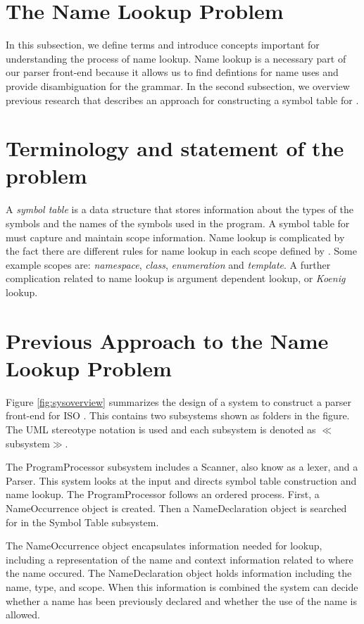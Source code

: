 \section{The Name Lookup Problem}

In this subsection, we define terms and introduce concepts
important for understanding the process of name lookup.
Name lookup is a necessary part of our parser front-end because it
allows us to find defintions for name uses and provide disambiguation for the grammar.
In the second subsection, we overview previous research that describes an approach for
constructing a symbol table for {\CPP}\cite{powertools}.

\section{Terminology and statement of the problem}

A {\em symbol table} is a data structure that stores information
about the types of the symbols and the names of the
symbols used in the program.  A symbol table for {\CPP} must capture and maintain
scope information.  Name lookup is complicated by the fact there are different rules
for name lookup in each scope defined by {\CPP}.  Some example scopes are: 
{\em namespace}, {\em class}, {\em enumeration} and {\em template}.  A further complication
related to name lookup is argument dependent lookup, or {\em Koenig} lookup.

\begin{figure*}[t]
 \centerline{\protect
\mbox{}}
  \caption{{\em Parser front-end design}.
}
   \label{fig:sysoverview}
\figline
\end{figure*}


\section{Previous Approach to the Name Lookup Problem}

Figure \ref{fig:sysoverview} summarizes the design of
a system to construct a parser front-end for ISO {\CPP}\cite{powertools}.
This contains two subsystems shown as folders in the figure.
The UML stereotype notation is used and each subsystem is denoted as $\ll${\sf subsystem}$\gg$.

The {\sf ProgramProcessor} subsystem includes a {\sf Scanner}, 
also know as a lexer, and a {\sf Parser}.  This system looks at the input
and directs symbol table construction and name lookup.  The ProgramProcessor 
follows an ordered process.  First, a {\sf NameOccurrence}
object is created.  Then a {\sf NameDeclaration} object is searched for in
the {\sf Symbol Table} subsystem.

The {\sf NameOccurrence} object encapsulates information
needed for lookup, including a representation of the name and context information related to
where the name occured.  The {\sf NameDeclaration} object holds information
including the name, type, and scope.  When this information is combined the system can
decide whether a name has been previously declared and whether the use of the name is allowed.



